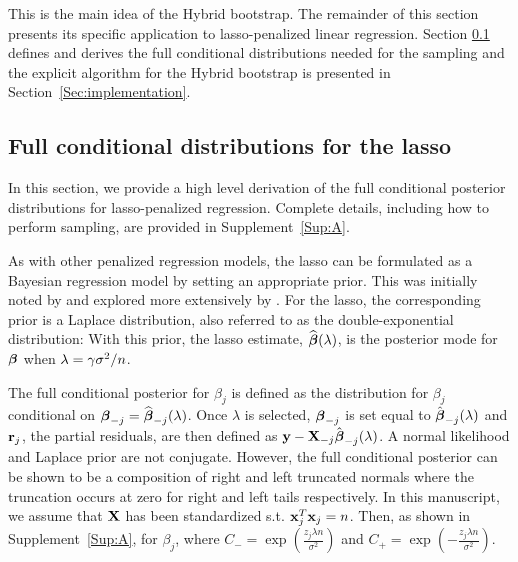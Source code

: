 This is the main idea of the Hybrid bootstrap. The remainder of this section presents its specific application to lasso-penalized linear regression. Section \ref{Sec:full-cond} defines and derives the full conditional distributions needed for the sampling and the explicit algorithm for the Hybrid bootstrap is presented in Section~\ref{Sec:implementation}.

\subsection{Full conditional distributions for the lasso}
\label{Sec:full-cond}

In this section, we provide a high level derivation of the full conditional posterior distributions for lasso-penalized regression. Complete details, including how to perform sampling, are provided in Supplement~\ref{Sup:A}.

As with other penalized regression models, the lasso can be formulated as a Bayesian regression model by setting an appropriate prior. This was initially noted by \cite{Tibshirani1996} and explored more extensively by \cite{Park2008}. For the lasso, the corresponding prior is a Laplace distribution, also referred to as the double-exponential distribution:
With this prior, the lasso estimate, $\widehat{\boldsymbol{\beta}}(\lambda)$, is the posterior mode for $\boldsymbol{\beta}$ when $\lambda = \gamma\sigma^2/n$.

The full conditional posterior for $\beta_j$ is defined as the distribution for $\beta_j$ conditional on $\boldsymbol{\beta}_{-j} = \widehat{\boldsymbol{\beta}}_{-j}(\lambda)$. Once $\lambda$ is selected, $\boldsymbol{\beta}_{-j}$ is set equal to $\hat{\boldsymbol{\beta}}_{-j}(\lambda)$ and $\mathbf{r}_{j}$, the partial residuals, are then defined as $\mathbf{y} - \mathbf{X}_{-j}\hat{\boldsymbol{\beta}}_{-j}(\lambda)$. A normal likelihood and Laplace prior are not conjugate. However, the full conditional posterior can be shown to be a composition of right and left truncated normals where the truncation occurs at zero for right and left tails respectively. In this manuscript, we assume that $\mathbf{X}$ has been standardized s.t. $\mathbf{x}_j^T\mathbf{x}_j = n$. Then, as shown in Supplement~\ref{Sup:A}, for $\beta_j$,
where $C_{-} = \exp(\frac{z_j \lambda n}{\sigma^2})$ and $C_{+} = \exp(-\frac{z_j \lambda n}{\sigma^2})$.

